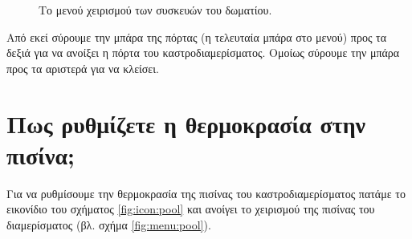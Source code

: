 \documentclass[a4paper,titlepage,twoside,12pt,leqno]{article}
\begin{document}
\begin{figure}
\begin{center}
\caption{Το μενού χειρισμού των συσκευών του δωματίου.}
\label{fig:menu:room}
\end{center}
\end{figure}

Από εκεί σύρουμε την μπάρα της πόρτας (η τελευταία μπάρα στο μενού) προς τα δεξιά για να ανοίξει η πόρτα του καστροδιαμερίσματος. Ομοίως σύρουμε την μπάρα προς τα αριστερά για να κλείσει.  

\section{Πως ρυθμίζετε η θερμοκρασία στην πισίνα;}

Για να ρυθμίσουμε την θερμοκρασία της πισίνας του καστροδιαμερίσματος πατάμε το εικονίδιο του σχήματος \ref{fig:icon:pool} και ανοίγει το χειρισμού της πισίνας του διαμερίσματος (βλ. σχήμα \ref{fig:menu:pool}).
\end{document}
